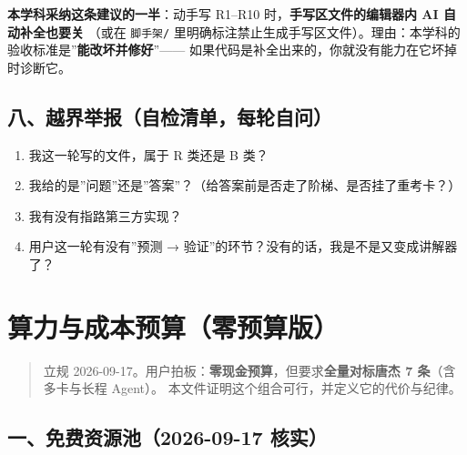 \documentclass[
  chinese,
  11pt,
]{ctexart}
\providecommand{\tightlist}{%
  \setlength{\itemsep}{0pt}\setlength{\parskip}{0pt}}
\begin{document}
\textbf{本学科采纳这条建议的一半}：动手写 R1--R10 时，\textbf{手写区文件的编辑器内 AI 自动补全也要关} （或在 \texttt{脚手架/} 里明确标注禁止生成手写区文件）。理由：本学科的验收标准是''\textbf{能改坏并修好}''------ 如果代码是补全出来的，你就没有能力在它坏掉时诊断它。

\subsection{八、越界举报（自检清单，每轮自问）}\label{ux516bux8d8aux754cux4e3eux62a5ux81eaux68c0ux6e05ux5355ux6bcfux8f6eux81eaux95ee}

\begin{enumerate}
\def\labelenumi{\arabic{enumi}.}
\tightlist
\item
  我这一轮写的文件，属于 R 类还是 B 类？
\item
  我给的是''问题''还是''答案''？（给答案前是否走了阶梯、是否挂了重考卡？）
\item
  我有没有指路第三方实现？
\item
  用户这一轮有没有''预测 → 验证''的环节？没有的话，我是不是又变成讲解器了？
\end{enumerate}

\newpage

\section{算力与成本预算（零预算版）}\label{ux7b97ux529bux4e0eux6210ux672cux9884ux7b97ux96f6ux9884ux7b97ux7248}

\begin{quote}
立规 2026-09-17。用户拍板：\textbf{零现金预算}，但要求\textbf{全量对标唐杰 7 条}（含多卡与长程 Agent）。 本文件证明这个组合可行，并定义它的代价与纪律。
\end{quote}

\subsection{一、免费资源池（2026-09-17 核实）}\label{ux4e00ux514dux8d39ux8d44ux6e90ux6c602026-09-17-ux6838ux5b9e}
\end{document}
